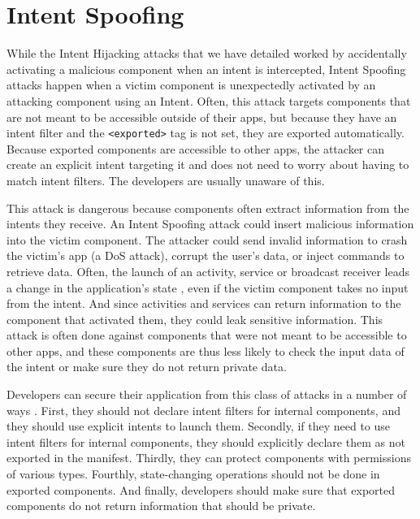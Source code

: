     \section{Intent Spoofing}
        \label{sec:intent_spoofing}
        
    While the Intent Hijacking attacks that we have detailed worked by accidentally activating a malicious component when an intent is intercepted, Intent Spoofing attacks happen when a victim component is unexpectedly activated by an attacking component using an Intent. Often, this attack targets components that are not meant to be accessible outside of their apps, but because they have an intent filter and the \lstinline|<exported>| tag is not set, they are exported automatically. Because exported components are accessible to other apps, the attacker can create an explicit intent targeting it and does not need to worry about having to match intent filters. The developers are usually unaware of this.
    
    This attack is dangerous because components often extract information from the intents they receive. An Intent Spoofing attack could insert malicious information into the victim component. The attacker could send invalid information to crash the victim’s app (a DoS attack), corrupt the user’s data, or inject commands to retrieve data. Often, the launch of an activity, service or broadcast receiver leads a change in the application’s state \cite{2010_icc_paper}, even if the victim component takes no input from the intent. And since activities and services can return information to the component that activated them, they could leak sensitive information. This attack is often done against components that were not meant to be accessible to other apps, and these components are thus less likely to check the input data of the intent or make sure they do not return private data.
    
    Developers can secure their application from this class of attacks in a number of ways  \cite{2010_icc_paper}. First, they should not declare intent filters for internal components, and they should use explicit intents to launch them. Secondly, if they need to use intent filters for internal components, they should explicitly declare them as not exported in the manifest. Thirdly, they can protect components with permissions of various types. Fourthly, state-changing operations should not be done in exported components. And finally, developers should make sure that exported components do not return information that should be private.
    